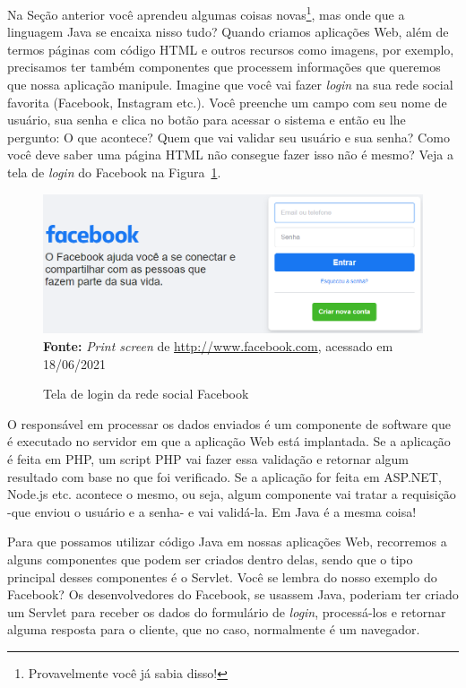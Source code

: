 Na Seção anterior você aprendeu algumas coisas novas\footnote{Provavelmente você já sabia disso!}, mas onde que a linguagem Java se encaixa nisso tudo? Quando criamos aplicações Web, além de termos páginas com código HTML e outros recursos como imagens, por exemplo, precisamos ter também componentes que processem informações que queremos que nossa aplicação manipule. Imagine que você vai fazer \textit{login} na sua rede social favorita (Facebook, Instagram etc.). Você preenche um campo com seu nome de usuário, sua senha e clica no botão para acessar o sistema e então eu lhe pergunto: O que acontece? Quem que vai validar seu usuário e sua senha? Como você deve saber uma página HTML não consegue fazer isso não é mesmo? Veja a tela de \textit{login} do Facebook na Figura~\ref{fig:cap01LoginFacebook}.

\FloatBarrier
\begin{figure}[!htbp]
    \centering
    \caption{Tela de login da rede social Facebook}
    \includegraphics[scale=0.38]{imagens/cap01LoginFacebook}
    \\\textbf{Fonte:} \textit{Print screen} de \url{http://www.facebook.com}, acessado em 18/06/2021
    \label{fig:cap01LoginFacebook}
\end{figure}
\FloatBarrier

O responsável em processar os dados enviados é um componente de software que é executado no servidor em que a aplicação Web está implantada. Se a aplicação é feita em PHP, um script PHP vai fazer essa validação e retornar algum resultado com base no que foi verificado. Se a aplicação for feita em ASP.NET, Node.js etc. acontece o mesmo, ou seja, algum componente vai tratar a requisição -que enviou o usuário e a senha- e vai validá-la. Em Java é a mesma coisa!

Para que possamos utilizar código Java em nossas aplicações Web, recorremos a alguns componentes que podem ser criados dentro delas, sendo que o tipo principal desses componentes é o Servlet. Você se lembra do nosso exemplo do Facebook? Os desenvolvedores do Facebook, se usassem Java, poderiam ter criado um Servlet para receber os dados do formulário de \textit{login}, processá-los e retornar alguma resposta para o cliente, que no caso, normalmente é um navegador.

